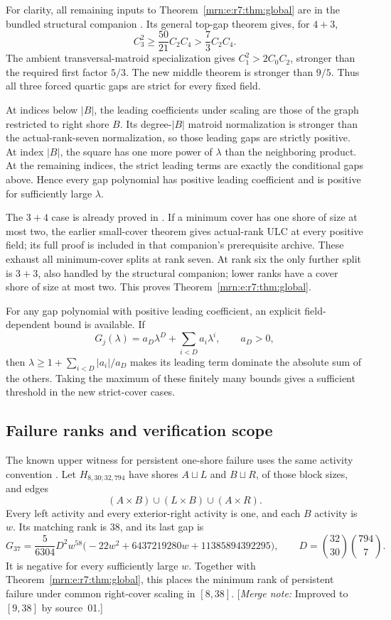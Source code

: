 \documentclass[11pt,a4paper]{article}
\theoremstyle{remark}\newtheorem{remark}[theorem]{Remark}
\newcommand{\mnote}[1]{[\textit{Merge note:} #1]}
\begin{document}
For clarity, all remaining inputs to Theorem~\ref{mrn:e:r7:thm:global} are in the bundled structural companion \cite{b:m08s}. Its general top-gap theorem gives, for $4+3$,
\[
 C_3^2\ge\frac{50}{21}C_2C_4>\frac73C_2C_4.
\]
The ambient transversal-matroid specialization gives $C_1^2>2C_0C_2$, stronger than the required first factor $5/3$. The new middle theorem is stronger than $9/5$. Thus all three forced quartic gaps are strict for every fixed field.

At indices below $|B|$, the leading coefficients under scaling are those of the graph restricted to right shore $B$. Its degree-$|B|$ matroid normalization is stronger than the actual-rank-seven normalization, so those leading gaps are strictly positive. At index $|B|$, the square has one more power of $\lambda$ than the neighboring product. At the remaining indices, the strict leading terms are exactly the conditional gaps above. Hence every gap polynomial has positive leading coefficient and is positive for sufficiently large $\lambda$.

The $3+4$ case is already proved in \cite{b:m08s}. If a minimum cover has one shore of size at most two, the earlier small-cover theorem gives actual-rank ULC at every positive field; its full proof is included in that companion's prerequisite archive. These exhaust all minimum-cover splits at rank seven. At rank six the only further split is $3+3$, also handled by the structural companion; lower ranks have a cover shore of size at most two. This proves Theorem~\ref{mrn:e:r7:thm:global}.

For any gap polynomial with positive leading coefficient, an explicit field-dependent bound is available. If
\[
 G_j(\lambda)=a_D\lambda^D+\sum_{i<D}a_i\lambda^i,\qquad a_D>0,
\]
then $\lambda\ge1+\sum_{i<D}|a_i|/a_D$ makes its leading term dominate the absolute sum of the others. Taking the maximum of these finitely many bounds gives a sufficient threshold in the new strict-cover cases.

\subsection{Failure ranks and verification scope}
The known upper witness for persistent one-shore failure uses the same activity convention \cite{b:m55}. Let $H_{8,30;32,794}$ have shores $A\sqcup L$ and $B\sqcup R$, of those block sizes, and edges
\[
 (A\times B)\cup(L\times B)\cup(A\times R).
\]
Every left activity and every exterior-right activity is one, and each $B$ activity is $w$. Its matching rank is $38$, and its last gap is
\[
 G_{37}=\frac5{6304}D^2w^{58}
 \bigl(-22w^2+6437219280w+11385894392295\bigr),
 \qquad D=\binom{32}{30}\binom{794}{7}.
\]
It is negative for every sufficiently large $w$. Together with Theorem~\ref{mrn:e:r7:thm:global}, this places the minimum rank of persistent failure under common right-cover scaling in $[8,38]$. \mnote{Improved to $[9,38]$ by source~01.}
\end{document}
